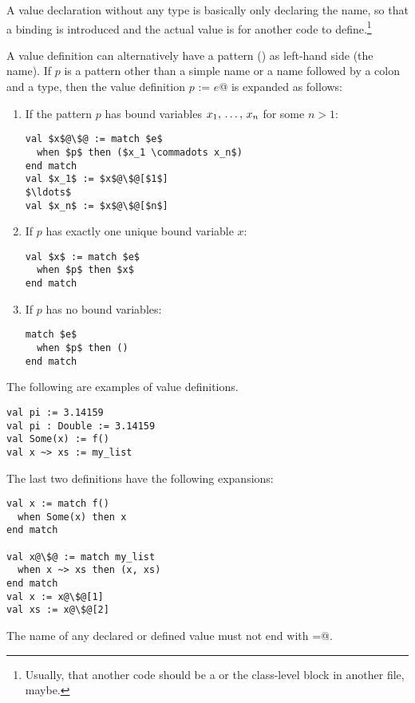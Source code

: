 A value declaration without any type is basically only declaring the name, so that a binding is introduced and the actual value is for another code to define.\footnote{Usually, that another code should be a  or the class-level block in another file, maybe.}

A value definition can alternatively have a pattern () as left-hand side (the name). If $p$ is a pattern other than a simple name or a name followed by a colon and a type, then the value definition \lstinline@val $p$ := $e$@ is expanded as follows: 

\begin{enumerate}
\item
If the pattern $p$ has bound variables $x_1 ,\, \ldots ,\, x_n$ for some $n > 1$:
\begin{lstlisting}[escapechar=@]
val $x$@\$@ := match $e$
  when $p$ then ($x_1 \commadots x_n$)
end match
val $x_1$ := $x$@\$@[$1$]
$\ldots$
val $x_n$ := $x$@\$@[$n$]
\end{lstlisting}

\item
If $p$ has exactly one unique bound variable $x$:
\begin{lstlisting}
val $x$ := match $e$
  when $p$ then $x$
end match
\end{lstlisting}

\item
If $p$ has no bound variables:
\begin{lstlisting}
match $e$
  when $p$ then ()
end match
\end{lstlisting}
\end{enumerate}

\example The following are examples of value definitions. 

\begin{lstlisting}
val pi := 3.14159
val pi : Double := 3.14159
val Some(x) := f()
val x ~> xs := my_list
\end{lstlisting}

The last two definitions have the following expansions:

\begin{lstlisting}[escapechar=@]
val x := match f()
  when Some(x) then x
end match

val x@\$@ := match my_list
  when x ~> xs then (x, xs)
end match
val x := x@\$@[1]
val xs := x@\$@[2]
\end{lstlisting}

The name of any declared or defined value must not end with \lstinline@=@. 

